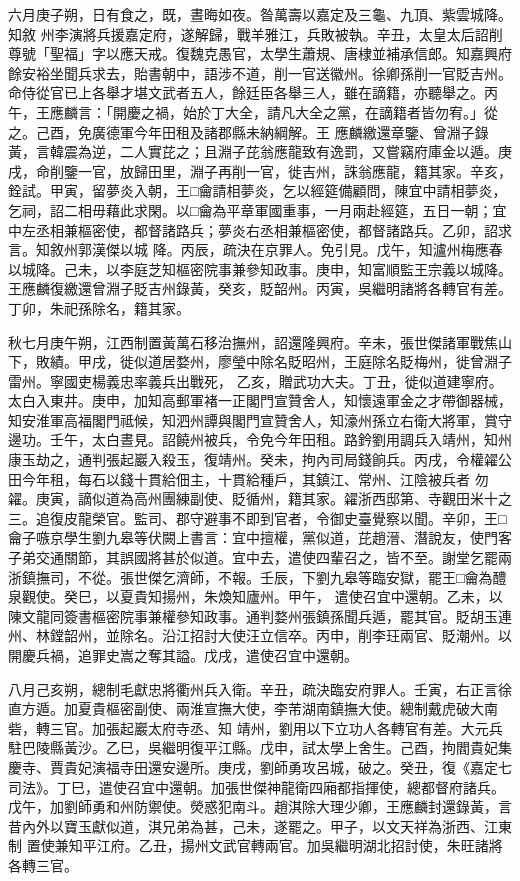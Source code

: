 \begin{pinyinscope}
 六月庚子朔，日有食之，既，晝晦如夜。昝萬壽以嘉定及三龜、九頂、紫雲城降。知敘
 州李演將兵援嘉定府，遂解歸，戰羊雅江，兵敗被執。辛丑，太皇太后詔削尊號「聖福」字以應天戒。復魏克愚官，太學生蕭規、唐棣並補承信郎。知嘉興府餘安裕坐聞兵求去，貽書朝中，語涉不道，削一官送徽州。徐卿孫削一官貶吉州。命侍從官已上各舉才堪文武者五人，餘廷臣各舉三人，雖在謫籍，亦聽舉之。丙午，王應麟言：「開慶之禍，始於丁大全，請凡大全之黨，在謫籍者皆勿宥。」從之。己酉，免廣德軍今年田租及諸郡縣未納綱解。王
 應麟繳還章鑒、曾淵子錄黃，言韓震為逆，二人實芘之；且淵子芘翁應龍致有逸罰，又嘗竊府庫金以遁。庚戌，命削鑒一官，放歸田里，淵子再削一官，徙吉州，誅翁應龍，籍其家。辛亥，銓試。甲寅，留夢炎入朝，王□龠請相夢炎，乞以經筵備顧問，陳宜中請相夢炎，乞祠，詔二相毋藉此求閑。以□龠為平章軍國重事，一月兩赴經筵，五日一朝；宜中左丞相兼樞密使，都督諸路兵；夢炎右丞相兼樞密使，都督諸路兵。乙卯，詔求言。知敘州郭漢傑以城
 降。丙辰，疏決在京罪人。免引見。戊午，知瀘州梅應春以城降。己未，以李庭芝知樞密院事兼參知政事。庚申，知富順監王宗義以城降。王應麟復繳還曾淵子貶吉州錄黃，癸亥，貶韶州。丙寅，吳繼明諸將各轉官有差。丁卯，朱祀孫除名，籍其家。



 秋七月庚午朔，江西制置黃萬石移治撫州，詔還隆興府。辛未，張世傑諸軍戰焦山下，敗績。甲戌，徙似道居婺州，廖瑩中除名貶昭州，王庭除名貶梅州，徙曾淵子雷州。寧國吏楊義忠率義兵出戰死，
 乙亥，贈武功大夫。丁丑，徙似道建寧府。太白入東井。庚申，加知高郵軍褚一正閣門宣贊舍人，知懷遠軍金之才帶御器械，知安淮軍高福閣門祗候，知泗州譚與閣門宣贊舍人，知濠州孫立右衛大將軍，賞守邊功。壬午，太白晝見。詔饒州被兵，令免今年田租。路鈐劉用調兵入靖州，知州康玉劫之，通判張起巖入殺玉，復靖州。癸未，拘內司局錢餉兵。丙戌，令權糴公田今年租，每石以錢十貫給佃主，十貫給種戶，其鎮江、常州、江陰被兵者
 勿糴。庚寅，謫似道為高州團練副使、貶循州，籍其家。糴浙西邸第、寺觀田米十之三。追復皮龍榮官。監司、郡守避事不即到官者，令御史臺覺察以聞。辛卯，王□龠子嗾京學生劉九皋等伏闕上書言：宜中擅權，黨似道，芘趙溍、潛說友，使門客子弟交通關節，其誤國將甚於似道。宜中去，遣使四輩召之，皆不至。謝堂乞罷兩浙鎮撫司，不從。張世傑乞濟師，不報。壬辰，下劉九皋等臨安獄，罷王□龠為醴泉觀使。癸巳，以夏貴知揚州，朱煥知廬州。甲午，
 遣使召宜中還朝。乙未，以陳文龍同簽書樞密院事兼權參知政事。通判婺州張鎮孫聞兵遁，罷其官。貶胡玉連州、林鏜韶州，並除名。沿江招討大使汪立信卒。丙申，削李玨兩官、貶潮州。以開慶兵禍，追罪史嵩之奪其謚。戊戌，遣使召宜中還朝。



 八月己亥朔，總制毛獻忠將衢州兵入衛。辛丑，疏決臨安府罪人。壬寅，右正言徐直方遁。加夏貴樞密副使、兩淮宣撫大使，李芾湖南鎮撫大使。總制戴虎破大南砦，轉三官。加張起巖太府寺丞、知
 靖州，劉用以下立功人各轉官有差。大元兵駐巴陵縣黃沙。乙巳，吳繼明復平江縣。戊申，試太學上舍生。己酉，拘閻貴妃集慶寺、賈貴妃演福寺田還安邊所。庚戌，劉師勇攻呂城，破之。癸丑，復《嘉定七司法》。丁巳，遣使召宜中還朝。加張世傑神龍衛四廂都指揮使，總都督府諸兵。戊午，加劉師勇和州防禦使。熒惑犯南斗。趙淇除大理少卿，王應麟封還錄黃，言昔內外以寶玉獻似道，淇兄弟為甚，己未，遂罷之。甲子，以文天祥為浙西、江東制
 置使兼知平江府。乙丑，揚州文武官轉兩官。加吳繼明湖北招討使，朱旺諸將各轉三官。




\end{pinyinscope}
